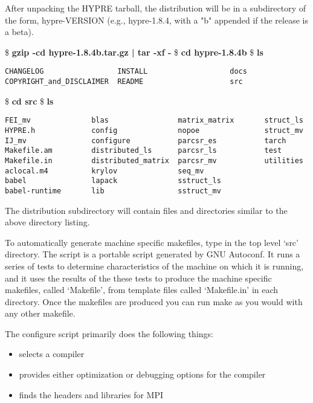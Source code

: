 After unpacking the HYPRE tarball, the distribution will be in a 
subdirectory of the form, hypre-VERSION (e.g., hypre-1.8.4, with a
"b" appended if the release is a beta).
\begin{ttfamily}
\begin{mdseries}
\linebreak
\$ \textbf{gzip -cd hypre-1.8.4b.tar.gz | tar -xf -}\linebreak
\$ \textbf{cd hypre-1.8.4b}\linebreak
\$ \textbf{ls}\linebreak
\begin{verbatim}
CHANGELOG                 INSTALL                   docs
COPYRIGHT_and_DISCLAIMER  README                    src
\end{verbatim}
\$ \textbf{cd src}\linebreak
\$ \textbf{ls}\linebreak
\begin{verbatim}
FEI_mv              blas                matrix_matrix       struct_ls
HYPRE.h             config              nopoe               struct_mv
IJ_mv               configure           parcsr_es           tarch
Makefile.am         distributed_ls      parcsr_ls           test
Makefile.in         distributed_matrix  parcsr_mv           utilities
aclocal.m4          krylov              seq_mv
babel               lapack              sstruct_ls
babel-runtime       lib                 sstruct_mv
\end{verbatim}
\end{mdseries}
\end{ttfamily}

The \hypre{} distribution subdirectory will contain files and directories 
similar to the above directory listing.

To automatically generate machine specific makefiles, type
 in the top level `src' directory.  The 
script is a portable script generated by GNU Autoconf.  It runs a
series of tests to determine characteristics of the machine on which
it is running, and it uses the results of the these tests to produce
the machine specific makefiles, called `Makefile', from template files
called `Makefile.in' in each directory.  Once the makefiles are
produced you can run make as you would with any other makefile.

The configure script primarily does the following things:
\begin{itemize}
\item selects a compiler
\item provides either optimization or debugging options for the compiler
\item finds the headers and libraries for MPI
\end{itemize}

